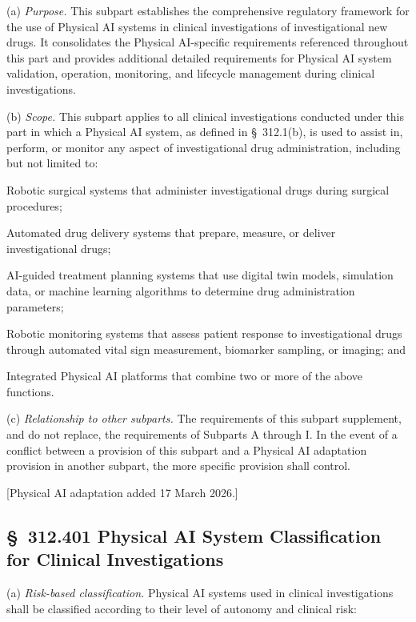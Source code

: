 (a) \textit{Purpose.} This subpart establishes the comprehensive regulatory framework for the use of Physical AI systems in clinical investigations of investigational new drugs. It consolidates the Physical AI-specific requirements referenced throughout this part and provides additional detailed requirements for Physical AI system validation, operation, monitoring, and lifecycle management during clinical investigations.

(b) \textit{Scope.} This subpart applies to all clinical investigations conducted under this part in which a Physical AI system, as defined in \S~312.1(b), is used to assist in, perform, or monitor any aspect of investigational drug administration, including but not limited to:

\begin{description}[leftmargin=0.8cm,style=sameline]
\item[(1)] Robotic surgical systems that administer investigational drugs during surgical procedures;
\item[(2)] Automated drug delivery systems that prepare, measure, or deliver investigational drugs;
\item[(3)] AI-guided treatment planning systems that use digital twin models, simulation data, or machine learning algorithms to determine drug administration parameters;
\item[(4)] Robotic monitoring systems that assess patient response to investigational drugs through automated vital sign measurement, biomarker sampling, or imaging; and
\item[(5)] Integrated Physical AI platforms that combine two or more of the above functions.
\end{description}

(c) \textit{Relationship to other subparts.} The requirements of this subpart supplement, and do not replace, the requirements of Subparts A through I. In the event of a conflict between a provision of this subpart and a Physical AI adaptation provision in another subpart, the more specific provision shall control.

[Physical AI adaptation added 17 March 2026.]

\subsection{\S~312.401 Physical AI System Classification for Clinical Investigations}

(a) \textit{Risk-based classification.} Physical AI systems used in clinical investigations shall be classified according to their level of autonomy and clinical risk:

